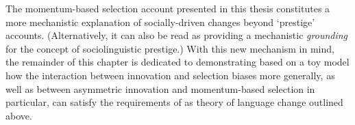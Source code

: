 The momentum-based selection account presented in this thesis constitutes a more mechanistic explanation of socially-driven changes beyond `prestige' accounts. (Alternatively, it can also be read as providing a mechanistic \emph{grounding} for the concept of sociolinguistic prestige.)
With this new mechanism in mind, the remainder of this chapter is dedicated to demonstrating based on a toy model how the interaction between innovation and selection biases more generally, as well as between asymmetric innovation and momentum-based selection in particular, can satisfy the requirements of as theory of language change outlined above.











